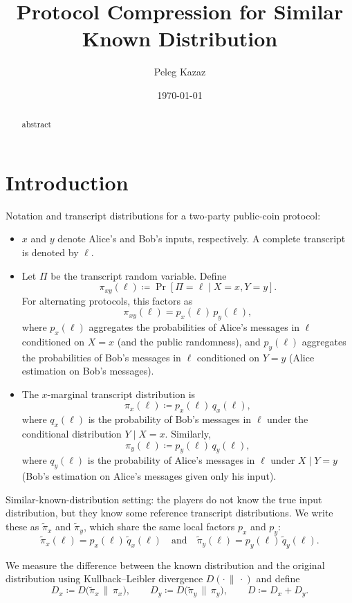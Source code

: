 \documentclass[11pt]{article}
\title{Protocol Compression for Similar Known Distribution}
\author{Peleg Kazaz}
\date{\today}
\begin{document}
\maketitle

\begin{abstract}
abstract 
\end{abstract}

\section{Introduction}

\begin{definition}
Notation and transcript distributions for a two-party public-coin protocol:
\begin{itemize}[leftmargin=*, itemsep=2pt]
  \item $x$ and $y$ denote Alice's and Bob's inputs, respectively. A complete transcript is denoted by $\ell$.
  \item Let $\Pi$ be the transcript random variable. Define
  \[
    \pi_{xy}(\ell) \coloneqq \Pr[\Pi=\ell \mid X=x, Y=y].
  \]
  For alternating protocols, this factors as
  \[
    \pi_{xy}(\ell) = p_x(\ell)\, p_y(\ell),
  \]
  where $p_x(\ell)$ aggregates the probabilities of Alice's messages in $\ell$ conditioned on $X=x$ (and the public randomness), and $p_y(\ell)$ aggregates the probabilities of Bob's messages in $\ell$ conditioned on $Y=y$ (Alice estimation on Bob's messages).
  \item The $x$-marginal transcript distribution is
  \[
    \pi_x(\ell) \coloneqq p_x(\ell)\, q_x(\ell),
  \]
  where $q_x(\ell)$ is the probability of Bob's messages in $\ell$ under the conditional distribution $Y\mid X=x$. Similarly,
  \[
    \pi_y(\ell) \coloneqq p_y(\ell)\, q_y(\ell),
  \]
  where $q_y(\ell)$ is the probability of Alice's messages in $\ell$ under $X\mid Y=y$ (Bob's estimation on Alice's messages given only his input).
\end{itemize}

Similar-known-distribution setting: the players do not know the true input distribution, but they know some reference transcript distributions. We write these as $\tilde{\pi}_x$ and $\tilde{\pi}_y$, which share the same local factors $p_x$ and $p_y$:
\[
  \tilde{\pi}_x(\ell) = p_x(\ell)\, \tilde{q}_x(\ell)
  \quad\text{and}\quad
  \tilde{\pi}_y(\ell) = p_y(\ell)\, \tilde{q}_y(\ell).
\]

We measure the difference between the known distribution and the original distribution using Kullback--Leibler divergence $D(\cdot\,\|\,\cdot)$ and define
\[
  D_x \coloneqq D\big(\tilde{\pi}_x \,\|\, \pi_x\big),\qquad
  D_y \coloneqq D\big(\tilde{\pi}_y \,\|\, \pi_y\big),\qquad
  D \coloneqq D_x + D_y.
\]
\end{definition}
\end{document}
